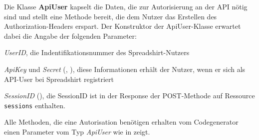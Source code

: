Die Klasse \textbf{ApiUser} kapselt die Daten, die zur Autorisierung an der \gls{API} nötig sind und stellt eine Methode bereit, die dem Nutzer das Erstellen des Authorization-Headers erspart. Der Konstruktor der ApiUser-Klasse erwartet dabei die Angabe der folgenden Parameter:

\begin{compactitem}
    \item \emph{UserID}, die Indentifikationsnummer des Spreadshirt-Nutzers
    \item \emph{ApiKey} und \emph{Secret} (, ), diese Informationen erhält der Nutzer, wenn er sich als \gls{API}-User bei Spreadshirt registriert
    \item \emph{SessionID} (), die SessionID ist in der Response der POST-Methode auf Ressource \texttt{sessions} enthalten.
\end{compactitem}

Alle Methoden, die eine Autorisation benötigen erhalten vom Codegenerator einen Parameter vom Typ \emph{ApiUser} wie  in  zeigt.